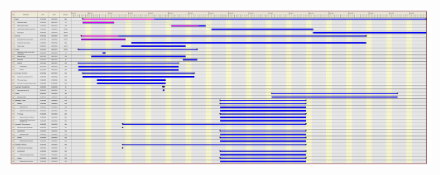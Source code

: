 \begin{figure}[h]
\centering \includegraphics[angle=270, width=1\textwidth, trim=45.5cm 0mm 0mm 0mm, clip]{img/mgmt-gantt.pdf}
\label{fig:mgmt-gantt-2}
\end{figure}


